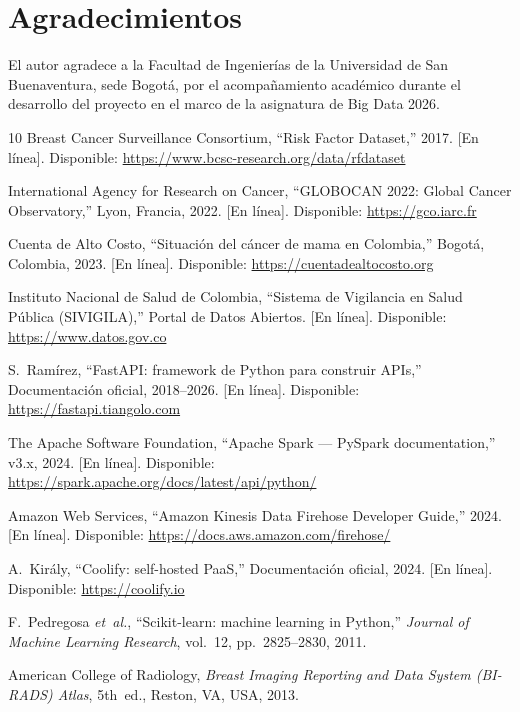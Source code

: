 \documentclass[conference,a4paper,10pt]{IEEEtran}
\begin{document}
\section*{Agradecimientos}
El autor agradece a la Facultad de Ingenierías de la Universidad de San
Buenaventura, sede Bogotá, por el acompañamiento académico durante el
desarrollo del proyecto en el marco de la asignatura de Big Data 2026.

\begin{thebibliography}{10}
Breast Cancer Surveillance Consortium, ``Risk Factor Dataset,'' 2017.
[En línea]. Disponible: \url{https://www.bcsc-research.org/data/rfdataset}

International Agency for Research on Cancer, ``GLOBOCAN 2022: Global
Cancer Observatory,'' Lyon, Francia, 2022. [En línea]. Disponible:
\url{https://gco.iarc.fr}

Cuenta de Alto Costo, ``Situación del cáncer de mama en Colombia,''
Bogotá, Colombia, 2023. [En línea]. Disponible:
\url{https://cuentadealtocosto.org}

Instituto Nacional de Salud de Colombia, ``Sistema de Vigilancia en
Salud Pública (SIVIGILA),'' Portal de Datos Abiertos. [En línea].
Disponible: \url{https://www.datos.gov.co}

S.~Ramírez, ``FastAPI: framework de Python para construir APIs,''
Documentación oficial, 2018--2026. [En línea]. Disponible:
\url{https://fastapi.tiangolo.com}

The Apache Software Foundation, ``Apache Spark --- PySpark
documentation,'' v3.x, 2024. [En línea]. Disponible:
\url{https://spark.apache.org/docs/latest/api/python/}

Amazon Web Services, ``Amazon Kinesis Data Firehose Developer Guide,''
2024. [En línea]. Disponible:
\url{https://docs.aws.amazon.com/firehose/}

A.~Király, ``Coolify: self-hosted PaaS,'' Documentación oficial, 2024.
[En línea]. Disponible: \url{https://coolify.io}

F.~Pedregosa \emph{et~al.}, ``Scikit-learn: machine learning in
Python,'' \emph{Journal of Machine Learning Research}, vol.~12,
pp.~2825--2830, 2011.

American College of Radiology, \emph{Breast Imaging Reporting and Data
System (BI-RADS) Atlas}, 5th~ed., Reston, VA, USA, 2013.
\end{thebibliography}
\end{document}

